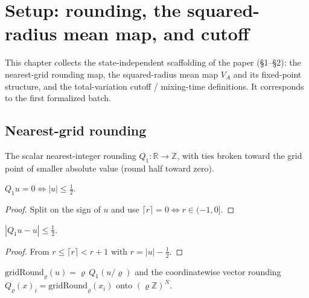 
\chapter{Setup: rounding, the squared-radius mean map, and cutoff}

This chapter collects the state-independent scaffolding of the paper (§1--§2):
the nearest-grid rounding map, the squared-radius mean map $V_A$ and its
fixed-point structure, and the total-variation cutoff / mixing-time definitions.
It corresponds to the first formalized batch.

\section{Nearest-grid rounding}

\begin{definition}
  \label{def:Q1}
  \leanok
  The scalar nearest-integer rounding $Q_1:\mathbb{R}\to\mathbb{Z}$, with ties
  broken toward the grid point of smaller absolute value (round half toward
  zero).
\end{definition}

\begin{lemma}
  \label{lem:Q1-zero}
  \leanok
  $Q_1 u = 0 \iff |u| \le \tfrac12$.
\end{lemma}
\begin{proof}
  \leanok
  Split on the sign of $u$ and use $\lceil r\rceil = 0 \iff r\in(-1,0]$.
\end{proof}

\begin{lemma}
  \label{lem:Q1-err}
  \leanok
  $|Q_1 u - u| \le \tfrac12$.
\end{lemma}
\begin{proof}
  \leanok
  From $r \le \lceil r\rceil < r+1$ with $r = |u| - \tfrac12$.
\end{proof}

\begin{definition}
  \label{def:Qrho}
  \leanok
  $\mathrm{gridRound}_\varrho(u) = \varrho\, Q_1(u/\varrho)$ and the
  coordinatewise vector rounding $Q_\varrho(x)_i = \mathrm{gridRound}_\varrho(x_i)$
  onto $(\varrho\mathbb{Z})^N$.
\end{definition}

